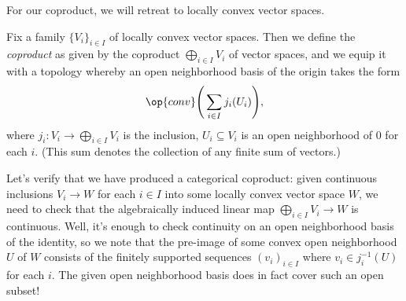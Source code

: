 \documentclass[notes.tex]{subfiles}
\begin{document}
For our coproduct, we will retreat to locally convex vector spaces.
\begin{definition}[coproduct]
	Fix a family $\{V_i\}_{i\in I}$ of locally convex vector spaces. Then we define the \textit{coproduct} as given by the coproduct $\bigoplus_{i\in I}V_i$ of vector spaces, and we equip it with a topology whereby an open neighborhood basis of the origin takes the form
	\[\op{conv}\Bigg(\sum_{i\in I}j_i(U_i)\Bigg),\]
	where $j_i\colon V_i\to\bigoplus_{i\in I}V_i$ is the inclusion, $U_i\subseteq V_i$ is an open neighborhood of $0$ for each $i$. (This sum denotes the collection of any finite sum of vectors.)
\end{definition}
\begin{remark}
	Let's verify that we have produced a categorical coproduct: given continuous inclusions $V_i\to W$ for each $i\in I$ into some locally convex vector space $W$, we need to check that the algebraically induced linear map $\bigoplus_{i\in I}V_i\to W$ is continuous. Well, it's enough to check continuity on an open neighborhood basis of the identity, so we note that the pre-image of some convex open neighborhood $U$ of $W$ consists of the finitely supported sequences $(v_i)_{i\in I}$ where $v_i\in j_i^{-1}(U)$ for each $i$. The given open neighborhood basis does in fact cover such an open subset!
\end{remark}
\end{document}
